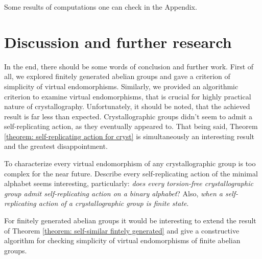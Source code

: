 \documentclass[a4paper,12pt]{amsart}
\theoremstyle{definition}
\begin{document}
	Some results of computations one can check in the Appendix. 	
	
	\newpage
	
	\section{Discussion and further research}
		In the end, there should be some words of conclusion and further work. First of all, we explored finitely generated abelian groups and gave a criterion of simplicity of virtual endomorphisms. Similarly, we provided an algorithmic criterion to examine virtual endomorphisms, that is crucial for highly practical nature of crystallography. Unfortunately, it should be noted, that the achieved result is far less than expected. Crystallographic groups didn't seem to admit a  self-replicating action, as they eventually appeared to. That being said, Theorem \ref{theorem: self-replicating action for cryst} is simultaneously an interesting result and the greatest disappointment. 
		
		
		
		To characterize every virtual endomorphism of any crystallographic group is too complex for the near future. Describe every self-replicating action of the minimal alphabet seems interesting, particularly: \textit{does every torsion-free crystallographic group admit self-replicating action on a binary alphabet}? Also, \textit{when a self-replicating action of a crystallographic group is finite state}. 
		
		For finitely generated abelian groups it would be interesting to extend the result of Theorem \ref{theorem: self-similar fintely generated} and give a constructive algorithm for checking simplicity of virtual endomorphisms of finite abelian groups.  
		
	\newpage 
	
\end{document}
